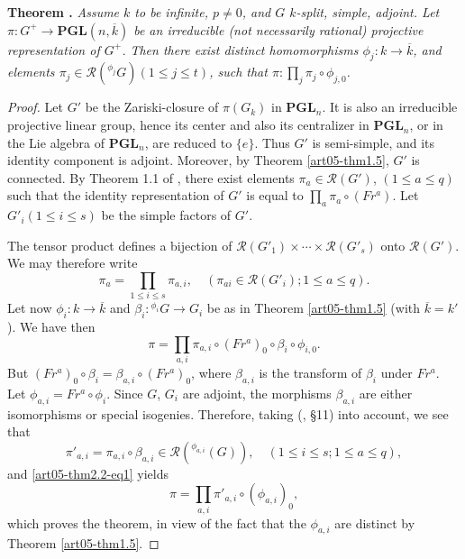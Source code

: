 \medskip
\noindent
{\bf Theorem .\label{art05-thm2.2}}
{\em Assume $k$ to be infinite, $p\neq 0$, and $G$ $k$-split, simple, adjoint. Let $\pi:G^{+}\to \mathbf{PGL}(n,\overline{k})$ be an irreducible (not necessarily rational) projective representation of $G^{+}$. Then there exist distinct homomorphisms $\phi_{j}:k\to \overline{k}$, and elements $\pi_{j}\in \mathscr{R}({}^{\phi_{j}}G)(1\leq j\leq t)$, such that $\pi:\prod\limits_{j}\pi_{j}\circ \phi_{j,0}$.}
\smallskip

\begin{proof}
Let $G'$ be the Zariski-closure of $\pi(G_{k})$ in $\mathbf{PGL}_{n}$. It is also an irreducible projective linear group, hence its center and also its centralizer in $\mathbf{PGL}_{n}$, or in the Lie algebra of $\mathbf{PGL}_{n}$, are reduced to $\{e\}$. Thus $G'$ is semi-simple, and its identity component is adjoint. Moreover, by Theorem \ref{art05-thm1.5}, $G'$ is connected. By Theorem 1.1 of \cite{art05-key9}, there exist elements $\pi_{a}\in \mathscr{R}(G')$, $(1\leq a\leq q)$ such that the identity representation of $G'$ is equal to $\prod\limits_{a}\pi_{a}\circ (Fr^{a})$. Let $G'_{i}(1\leq i\leq s)$ be the simple factors of $G'$.

The tensor product defines a bijection of $\mathscr{R}(G'_{1})\times\cdots\times \mathscr{R}(G'_{s})$ onto $\mathscr{R}(G')$. We may therefore write
$$
\pi_{a}=\prod\limits_{1\leq i\leq s}\pi_{a,i},\quad (\pi_{ai}\in \mathscr{R}(G'_{i}); 1\leq a\leq q).
$$\pageoriginale
Let now $\phi_{i}:k\to \overline{k}$ and $\beta_{i}:{}^{\phi_{i}}G\to G_{i}$ be as in Theorem \ref{art05-thm1.5} (with $\overline{k}=k'$). We have then
\begin{equation*}
\pi=\prod\limits_{a,i}\pi_{a,i}\circ (Fr^{a})_{0}\circ \beta_{i}\circ \phi_{i,0}.\tag{1}\label{art05-thm2.2-eq1}
\end{equation*}
But $(Fr^{a})_{0}\circ \beta_{i}=\beta_{a,i}\circ (Fr^{a})_{0}$, where $\beta_{a,i}$ is the transform of $\beta_{i}$ under $Fr^{a}$. Let $\phi_{a,i}=Fr^{a}\circ \phi_{i}$. Since $G$, $G_{i}$ are adjoint, the morphisms $\beta_{a,i}$ are either isomorphisms or special isogenies. Therefore, taking (\cite{art05-key9}, \S11) into account, we see that
$$
\pi'_{a,i}=\pi_{a,i}\circ \beta_{a,i}\in \mathscr{R}({}^{\phi_{a,i}}(G)),\quad (1\leq i\leq s; 1\leq a\leq q),
$$
and \eqref{art05-thm2.2-eq1} yields
\begin{equation*}
\pi=\prod\limits_{a,i}\pi'_{a,i}\circ (\phi_{a,i})_{0},\tag{2}\label{art05-thm2.2-eq2}
\end{equation*}
which proves the theorem, in view of the fact that the $\phi_{a,i}$ are distinct by Theorem \ref{art05-thm1.5}.
\end{proof}

